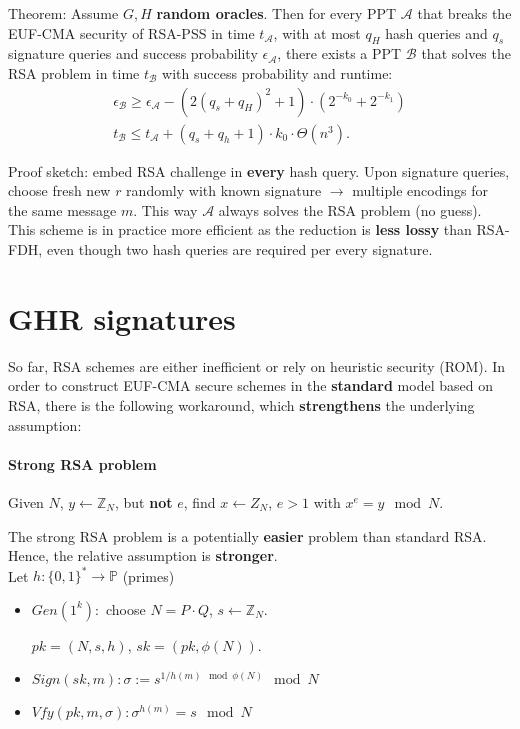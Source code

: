\documentclass[oneside]{book}
\newcommand{\Z}[0]{\mathbb{Z}}
\newcommand{\cA}[0]{\mathcal{A}}
\newcommand{\cB}[0]{\mathcal{B}}
\begin{document}
Theorem: Assume $G, H$ \textbf{random oracles}. Then for every PPT $\cA$ that breaks the EUF-CMA security of RSA-PSS in time $t_\cA$, with at most $q_H$ hash queries and $q_s$ signature queries and success probability $\epsilon_\cA$, there exists a PPT $\cB$ that solves the RSA problem in time $t_\cB$ with success probability and runtime:
\begin{align}
    \epsilon_\cB \ge \epsilon_\cA - (2(q_s + q_H)^2+1) \cdot (2^{-k_0} + 2^{-k_1})\\
t_\cB \le t_\cA + (q_s + q_h + 1) \cdot k_0 \cdot \Theta(n^3).
\end{align}

Proof sketch: embed RSA challenge in \textbf{every} hash query. Upon signature queries, choose fresh new $r$ randomly with known signature $\rightarrow$ multiple encodings for the same message $m$. This way $\cA$ always solves the RSA problem (no guess).\\

This scheme is in practice more efficient as the reduction is \textbf{less lossy} than RSA-FDH, even though two hash queries are required per every signature.

\section{GHR signatures}
So far, RSA schemes are either inefficient or rely on heuristic security (ROM). In order to construct EUF-CMA secure schemes in the \textbf{standard} model based on RSA, there is the following workaround, which \textbf{strengthens} the underlying assumption:
\paragraph{Strong RSA problem}
Given $N$, $y \leftarrow \Z_N$, but \textbf{not} $e$, find $x \leftarrow Z_N$, $e > 1$ with $x^e = y \mod N$.

The strong RSA problem is a potentially \textbf{easier} problem than standard RSA. Hence, the relative assumption is \textbf{stronger}.\\

Let $h: \{0,1\}^* \rightarrow \mathbb{P}$ (primes)
\begin{itemize}
    \item $Gen(1^k):$ choose $N = P \cdot Q$, $s \leftarrow \Z_N$.
    
    $pk = (N, s, h)$, $sk = (pk, \phi(N))$.
    \item $Sign(sk, m): \sigma := s^{1/h(m) \mod \phi(N)} \mod N$
    \item $Vfy(pk, m, \sigma): \sigma^{h(m)} = s \mod N$
\end{itemize}
\end{document}
